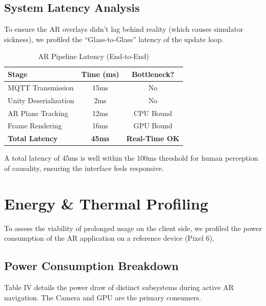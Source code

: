 \documentclass[conference]{IEEEtran}
\begin{document}
\subsection{System Latency Analysis}
To ensure the AR overlays didn't lag behind reality (which causes simulator sickness), we profiled the ``Glass-to-Glass'' latency of the update loop.

\begin{table}[htbp]
\caption{AR Pipeline Latency (End-to-End)}
\begin{center}
\begin{tabular}{lcc}
\toprule
\textbf{Stage} & \textbf{Time (ms)} & \textbf{Bottleneck?} \\
\midrule
MQTT Transmission & 15ms & No \\
Unity Deserialization & 2ms & No \\
AR Plane Tracking & 12ms & CPU Bound \\
Frame Rendering & 16ms & GPU Bound \\
\textbf{Total Latency} & \textbf{45ms} & \textbf{Real-Time OK} \\
\bottomrule
\end{tabular}
\end{center}
\end{table}

A total latency of 45ms is well within the 100ms threshold for human perception of causality, ensuring the interface feels responsive.

\section{Energy \& Thermal Profiling}
To assess the viability of prolonged usage on the client side, we profiled the power consumption of the AR application on a reference device (Pixel 6).

\subsection{Power Consumption Breakdown}
Table IV details the power draw of distinct subsystems during active AR navigation. The Camera and GPU are the primary consumers.
\end{document}

